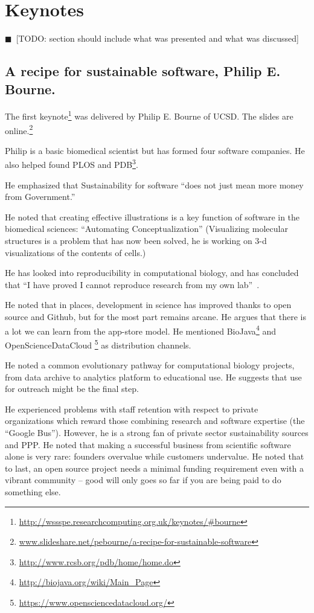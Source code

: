 \documentclass[11pt, oneside]{amsart}
\newcommand{\todo}[1]{{\color{blue}$\blacksquare$~\textsf{[TODO: #1]}}}
\begin{document}
\section{Keynotes}

\todo{section should include what was presented and what was discussed}

\subsection{A recipe for sustainable software, Philip E. Bourne.}

The first keynote\footnote{\url{http://wssspe.researchcomputing.org.uk/keynotes/\#bourne}}
was delivered by Philip E. Bourne of UCSD. The slides
are online.\footnote{\url{www.slideshare.net/pebourne/a-recipe-for-sustainable-software}}

Philip is a basic biomedical scientist but has formed four software
companies. He also helped found PLOS and PDB\footnote{\url{http://www.rcsb.org/pdb/home/home.do}}.

He emphasized that Sustainability for software ``does not just mean more
money from Government.''

He noted that creating effective illustrations is a key function of
software in the biomedical sciences: ``Automating Conceptualization''
(Visualizing molecular structures is a problem that has now been solved,
he is working on 3-d visualizations of the contents of cells.)

He has looked into reproducibility in computational biology, and has
concluded that ``I have proved I cannot reproduce research from my own
lab''~\cite{Veretnik}.

He noted that in places, development in science has improved thanks to
open source and Github, but for the most part remains arcane. He argues
that there is a lot we can learn from the app-store model. He
mentioned BioJava\footnote{\url{http://biojava.org/wiki/Main_Page}} and
OpenScienceDataCloud \footnote{\url{https://www.opensciencedatacloud.org/}} as
distribution channels.

He noted a common evolutionary pathway for computational biology
projects, from data archive to analytics platform to educational use. He
suggests that use for outreach might be the final step.

He experienced problems with staff retention with respect to private organizations which reward 
those combining research and software expertise (the ``Google Bus''). However,
he is a strong fan of private sector sustainability sources and PPP. He
noted that making a successful business from scientific software alone
is very rare: founders overvalue while customers undervalue. He noted
that to last, an open source project needs a minimal funding requirement
even with a vibrant community -- good will only goes so far if you are
being paid to do something else.
\end{document}
